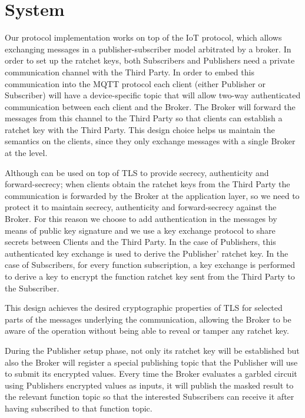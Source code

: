 \section{System}
\label{sec:system}

Our protocol implementation works on top of the IoT \MQTT{} protocol, which
allows exchanging messages in a publisher-subscriber model arbitrated by a
broker.  In order to set up the ratchet keys, both Subscribers and Publishers
need a private communication channel with the Third Party.  In order to embed
this communication into the MQTT protocol each client (either Publisher or
Subscriber) will have a device-specific topic that will allow two-way
authenticated communication between each client and the Broker.  The Broker
will forward the messages from this channel to the Third Party so that clients
can establish a ratchet key with the Third Party.  This design choice helps us
maintain the \MQTT{} semantics on the clients, since they only exchange
messages with a single Broker at the \MQTT{} level.

Although \MQTT{} can be used on top of TLS to provide secrecy, authenticity and
forward-secrecy; when clients obtain the ratchet keys from the Third Party
the communication is forwarded by the Broker at the application layer, so we
need to protect it to maintain secrecy, authenticity and forward-secrecy
against the Broker.  For this reason we choose to add authentication in the
\MQTT{} messages by means of public key signature and we use a key exchange
protocol to share secrets between Clients and the Third Party.  In the case of
Publishers, this authenticated key exchange is used to derive the Publisher'
ratchet key.  In the case of Subscribers, for every function subscription, a
key exchange is performed to derive a key to encrypt the function ratchet key
sent from the Third Party to the Subscriber.


This design achieves the desired cryptographic properties of TLS for selected
parts of the messages underlying the \MQTT{} communication, allowing the Broker
to be aware of the operation without being able to reveal or tamper any ratchet
key.

During the Publisher setup phase, not only its ratchet key will be established
but also the Broker will register a special publishing topic that the Publisher
will use to submit its encrypted values.  Every time the Broker evaluates a
garbled circuit using Publishers encrypted values as inputs, it will publish
the masked result to the relevant function topic so that the interested
Subscribers can receive it after having subscribed to that function topic.

